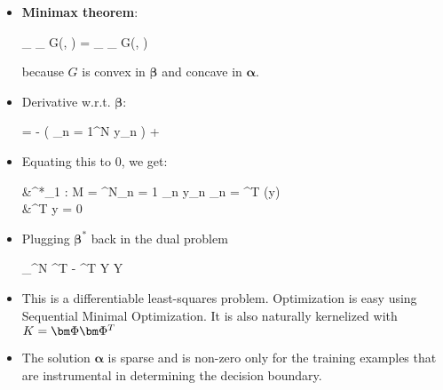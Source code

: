 \begin{itemize}
\begin{itemize}
		\item \textbf{Minimax theorem}: 
		\begin{myalign*}
		    \min_{\bm \beta} \max_{\bm \alpha} G(\bm \beta, \bm \alpha) = \max_{\bm \alpha} \min_{\bm \beta} G(\bm \beta, \bm \alpha)
		\end{myalign*}
		because $G$ is convex in $\bm \beta$ and concave in $\bm \alpha$.
		\item Derivative w.r.t. $\bm \beta$:
		\begin{myalign*}
		     = - 
		    \left(
		    	\sum_{n = 1}^N \alpha y_n \tilde{\phi_n}
		    \right)
		    + 
		\end{myalign*}
		\item Equating this to 0, we get:
			\begin{myalign*}
			    &\bm \beta^*_{1 : M} = \sum^N_{n = 1} \alpha_n y_n \phi_n = \bm \Phi^T (\*y) \bm \alpha\\
			    &\bm \alpha^T \*y = 0
			\end{myalign*}
		\item Plugging $\bm \beta^*$ back in the dual problem
		\begin{myalign*}
		    \max_{\bm \alpha \in [0, C]^N} \bm \alpha^T  -  \bm \alpha^T \*Y \bm \Phi \bm \Phi \* Y \bm \alpha
		\end{myalign*}
		\item This is a differentiable least-squares problem. Optimization is easy using Sequential Minimal Optimization. It is also naturally kernelized with $\*K = \bm \Phi \bm \Phi^T$
		\item The solution $\bm \alpha$ is sparse and is non-zero only for the training examples that are instrumental in determining the decision boundary.
	\end{itemize}
\end{itemize}


